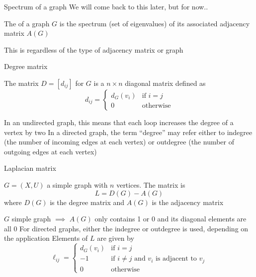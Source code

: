 \documentclass[aspectratio=43]{beamer}
\begin{document}
\begin{frame}{Spectrum of a graph}
	We will come back to this later, but for now..
	\vfill
	\begin{definition}
		The  of a graph $G$ is the spectrum (set of eigenvalues) of its associated adjacency matrix $A(G)$
	\end{definition}
	\vfill
	This is regardless of the type of adjacency matrix or graph
\end{frame}





\begin{frame}{Degree matrix}
	\begin{definition}
		The  matrix $D=[d_{ij}]$ for $G$ is a $n \times n$ diagonal matrix defined as
		\[
			d_{ij} = \begin{cases}
				d_G(v_i) & \text{if } i = j \\
				0 & \text{otherwise}
			\end{cases}
		\]
	\end{definition}
\vfill
In an undirected graph, this means that each loop increases the degree of a vertex by two
\vfill
In a directed graph, the term ``degree'' may refer either to indegree (the number of incoming edges at each vertex) or outdegree (the number of outgoing edges at each vertex)
\end{frame}

\begin{frame}{Laplacian matrix}
\begin{definition}
	$G=(X,U)$ a simple graph with $n$ vertices. The  matrix is 
	\[
		L=D(G)-A(G)
	\]
	where $D(G)$ is the degree matrix and $A(G)$ is the adjacency matrix
\end{definition}
$G$ simple graph $\implies$ $A(G)$ only contains 1 or 0 and its diagonal elements are all 0
\vfill
For directed graphs, either the indegree or outdegree is used, depending on the application
\vfill
Elements of $L$ are given by
\[
\ell_{ij}=\begin{cases}
	d_G(v_{i}) & \text{if } i=j\\
	-1 & \text{if } i\neq j \text{ and } v_{i} 
	\text{ is adjacent to }v_{j}\\
	0 & \text{otherwise}
\end{cases}
\]
\end{frame}
\end{document}
